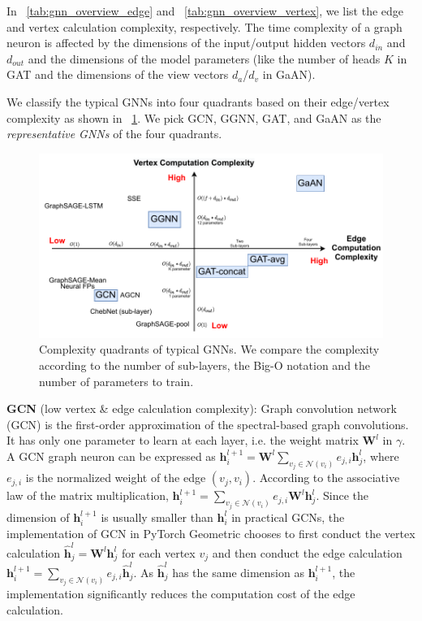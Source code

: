 In \tablename~\ref{tab:gnn_overview_edge} and \tablename~\ref{tab:gnn_overview_vertex}, we list the edge and vertex calculation complexity, respectively.
The time complexity of a graph neuron is affected by the dimensions of the input/output hidden vectors $d_{in}$ and $d_{out}$ and the dimensions of the model parameters (like the number of heads $K$ in GAT and the dimensions of the view vectors $d_a$/$d_v$ in GaAN).

We classify the typical GNNs into four quadrants based on their edge/vertex complexity as shown in \figurename~\ref{fig:gnn_complexity_quadrant}. We pick GCN, GGNN, GAT, and GaAN as the \emph{representative GNNs} of the four quadrants.

\begin{figure}
    \centering
    \includegraphics[width=0.7\columnwidth]{figs/illustration/GNN_complexity_quadrant.pdf}
    \caption{Complexity quadrants of typical GNNs. We compare the complexity according to the number of sub-layers, the Big-O notation and the number of parameters to train.}
    \label{fig:gnn_complexity_quadrant}
\end{figure}

\textbf{GCN} \cite{kipf2017_gcn} (low vertex \& edge calculation complexity): Graph convolution network (GCN) is the first-order approximation of the spectral-based graph convolutions.
It has only one parameter to learn at each layer, i.e. the weight matrix $\boldsymbol{W}^l$ in $\gamma$.
A GCN graph neuron can be expressed as $\boldsymbol{h}^{l+1}_i = \boldsymbol{W}^l\sum_{v_j \in \mathcal{N}(v_i)}{e_{j,i}\boldsymbol{h}^l_j}$, where $e_{j,i}$ is the normalized weight of the edge $(v_j, v_i)$.
According to the associative law of the matrix multiplication, $\boldsymbol{h}^{l+1}_i = \sum_{v_j \in \mathcal{N}(v_i)}{e_{j,i}\boldsymbol{W}^l\boldsymbol{h}^l_j}$.
Since the dimension of $\boldsymbol{h}^{l+1}_i$ is usually smaller than $\boldsymbol{h}^l_i$ in practical GCNs, the implementation of GCN in PyTorch Geometric chooses to first conduct the vertex calculation $\hat{\boldsymbol{h}}^l_j = \boldsymbol{W}^l\boldsymbol{h}^l_j$ for each vertex $v_j$ and then conduct the edge calculation $\boldsymbol{h}^{l+1}_i=\sum_{v_j\in\mathcal{N}(v_i)}{e_{j,i}\hat{\boldsymbol{h}}^l_j}$.
As $\hat{\boldsymbol{h}}^l_j$ has the same dimension as $\boldsymbol{h}^{l+1}_i$, the implementation significantly reduces the  computation cost of the edge calculation.

